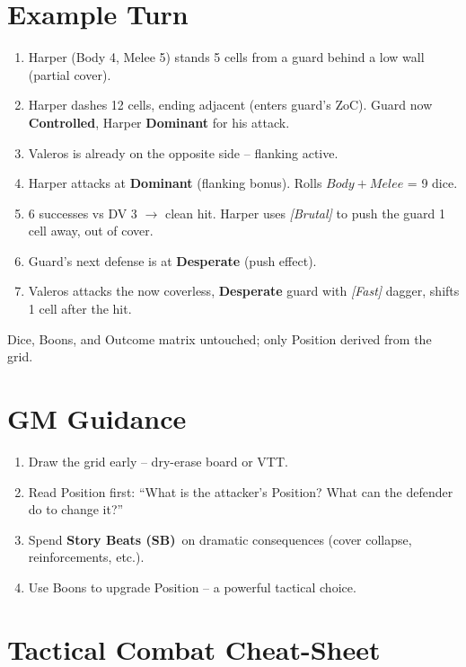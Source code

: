 \documentclass[12pt]{article}
\newcommand{\term}[1]{\textit{#1}}
\newcommand{\dice}[2]{\ensuremath{\displaystyle #1\!\!+\!\!#2}}   %
\newcommand{\storybeats}{\textbf{Story Beats (SB)}}   %
\newcommand{\pos}[1]{\textbf{#1}}
\begin{document}
\section{Example Turn}
\begin{enumerate}[label=\arabic\textit{., leftmargin=}]
    \item Harper (Body 4, Melee 5) stands 5 cells from a guard behind a low wall (partial cover).
    \item Harper dashes 12 cells, ending adjacent (enters guard's ZoC). Guard now \pos{Controlled}, Harper \pos{Dominant} for his attack.
    \item Valeros is already on the opposite side -- flanking active.
    \item Harper attacks at \pos{Dominant} (flanking bonus). Rolls \dice{Body}{Melee} = 9 dice.
    \item 6 successes vs DV 3 $\rightarrow$ clean hit. Harper uses \term{[Brutal]} to push the guard 1 cell away, out of cover.
    \item Guard's next defense is at \pos{Desperate} (push effect).
    \item Valeros attacks the now coverless, \pos{Desperate} guard with \term{[Fast]} dagger, shifts 1 cell after the hit.
\end{enumerate}
\noindent Dice, Boons, and Outcome matrix untouched; only Position derived from the grid.

\section{GM Guidance}
\begin{enumerate}[label=\arabic\textit{., leftmargin=}]
    \item Draw the grid early -- dry-erase board or VTT.
    \item Read Position first: ``What is the attacker's Position? What can the defender do to change it?''
    \item Spend \storybeats\ on dramatic consequences (cover collapse, reinforcements, etc.).
    \item Use Boons to upgrade Position -- a powerful tactical choice.
\end{enumerate}

\clearpage
\appendix
\section{Tactical Combat Cheat-Sheet}
\label{app:cheatsheet}
\end{document}
